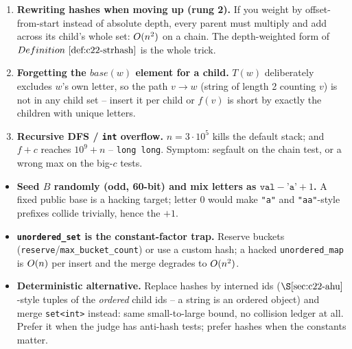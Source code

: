 \begin{warningbox}
\begin{enumerate}[nosep,leftmargin=1.6em]
  \item \textbf{Rewriting hashes when moving up (rung 2).} If you weight by
        offset-from-start instead of absolute depth, every parent must multiply and
        add across its child's whole set: \(O(n^2)\) on a chain.  The
        depth-weighted form of \(\defref{c22-strhash}\) is the whole trick.
  \item \textbf{Forgetting the \(\mathit{base}(w)\) element for a child.} \(T(w)\)
        deliberately excludes \(w\)'s own letter, so the path \(v\!\to\!w\) (string
        of length 2 counting \(v\)) is not in any child set -- insert it per child
        or \(f(v)\) is short by exactly the children with unique letters.
  \item \textbf{Recursive DFS / \texttt{int} overflow.} \(n=3\cdot10^{5}\) kills the
        default stack; and \(f+c\) reaches \(10^{9}+n\) -- \texttt{long long}.
        Symptom: segfault on the chain test, or a wrong max on the big-\(c\) tests.
\end{enumerate}
\end{warningbox}

\begin{hardeningbox}
\begin{itemize}[nosep,leftmargin=1.4em]
  \item \textbf{Seed \(B\) randomly (odd, 60-bit) and mix letters as
        \(\texttt{val}-\texttt{'a'}+1\).} A fixed public base is a hacking target;
        letter \(0\) would make \texttt{"a"} and \texttt{"aa"}-style prefixes
        collide trivially, hence the \(+1\).
  \item \textbf{\texttt{unordered\_set} is the constant-factor trap.} Reserve buckets
        (\texttt{reserve}/\texttt{max\_bucket\_count}) or use a custom hash;
        a hacked \texttt{unordered\_map} is \(O(n)\) per insert and the merge
        degrades to \(O(n^2)\).
  \item \textbf{Deterministic alternative.} Replace hashes by interned ids
        (\(\secref{c22-ahu}\)-style tuples of the \emph{ordered} child ids -- a
        string is an ordered object) and merge \texttt{set<int>} instead: same
        small-to-large bound, no collision ledger at all.  Prefer it when the judge
        has anti-hash tests; prefer hashes when the constants matter.
\end{itemize}
\end{hardeningbox}

